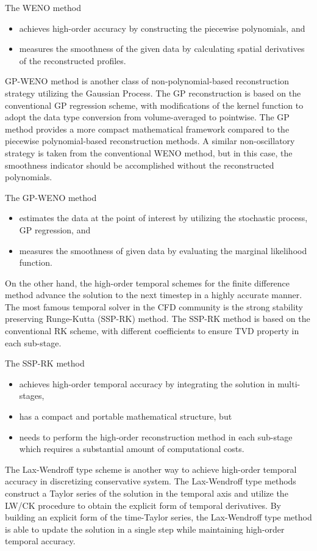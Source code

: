 The WENO method
\begin{itemize}
    \item achieves high-order accuracy by constructing the piecewise polynomials, and
    \item measures the smoothness of the given data by calculating spatial derivatives of the reconstructed profiles.
\end{itemize}

GP-WENO method is another class of non-polynomial-based reconstruction strategy
utilizing the Gaussian Process.
The GP reconstruction is based on the conventional GP regression scheme,
with modifications of the kernel function
to adopt the data type conversion from volume-averaged to pointwise.
The GP method provides a more compact mathematical framework
compared to the piecewise polynomial-based reconstruction methods.
A similar non-oscillatory strategy is taken from the conventional WENO method,
but in this case, the smoothness indicator should be accomplished without the reconstructed polynomials.

The GP-WENO method
\begin{itemize}
    \item estimates the data at the point of interest by utilizing the stochastic process, GP regression, and
    \item measures the smoothness of given data by evaluating the marginal likelihood function.
\end{itemize}

On the other hand, the high-order temporal schemes for the finite difference method
advance the solution to the next timestep in a highly accurate manner.
The most famous temporal solver in the CFD community is
the strong stability preserving Runge-Kutta (SSP-RK) method.
The SSP-RK method is based on the conventional RK scheme,
with different coefficients to ensure TVD property in each sub-stage.

The SSP-RK method
\begin{itemize}
    \item achieves high-order temporal accuracy by integrating the solution in multi-stages,
    \item has a compact and portable mathematical structure, but
    \item needs to perform the high-order reconstruction method in each sub-stage which requires a substantial amount of computational costs.
\end{itemize}

The Lax-Wendroff type scheme is another way to achieve high-order temporal accuracy in discretizing conservative system.
The Lax-Wendroff type methods construct a Taylor series of the solution in the temporal axis
and utilize the LW/CK procedure to obtain the explicit form of temporal derivatives.
By building an explicit form of the time-Taylor series,
the Lax-Wendroff type method is able to update the solution in a single step
while maintaining high-order temporal accuracy.

